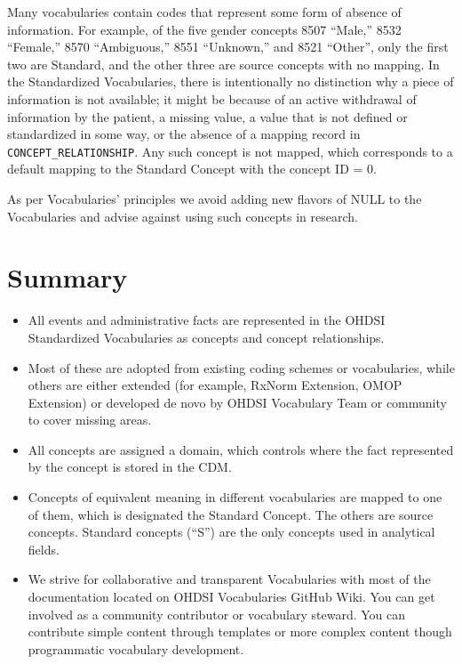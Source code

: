 \documentclass[
  letterpaper,
  paper=7in:10in,
  pagesize=pdftex,
  headinclude=on,
  footinclude=on,
  12pt]{scrbook}
\begin{document}
Many vocabularies contain codes that represent some form of absence of
information. For example, of the five gender concepts 8507 ``Male,''
8532 ``Female,'' 8570 ``Ambiguous,'' 8551 ``Unknown,'' and 8521
``Other'', only the first two are Standard, and the other three are
source concepts with no mapping. In the Standardized Vocabularies, there
is intentionally no distinction why a piece of information is not
available; it might be because of an active withdrawal of information by
the patient, a missing value, a value that is not defined or
standardized in some way, or the absence of a mapping record in
\texttt{CONCEPT\_RELATIONSHIP}. Any such concept is not mapped, which
corresponds to a default mapping to the Standard Concept with the
concept ID = 0.

As per Vocabularies' principles we avoid adding new flavors of NULL to
the Vocabularies and advise against using such concepts in research.

\section{Summary}\label{summary}

\begin{itemize}
\item
  All events and administrative facts are represented in the OHDSI
  Standardized Vocabularies as concepts and concept relationships.
\item
  Most of these are adopted from existing coding schemes or
  vocabularies, while others are either extended (for example, RxNorm
  Extension, OMOP Extension) or developed de novo by OHDSI Vocabulary
  Team or community to cover missing areas.
\item
  All concepts are assigned a domain, which controls where the fact
  represented by the concept is stored in the CDM.
\item
  Concepts of equivalent meaning in different vocabularies are mapped to
  one of them, which is designated the Standard Concept. The others are
  source concepts. Standard concepts (``S'') are the only concepts used
  in analytical fields.
\item
  We strive for collaborative and transparent Vocabularies with most of
  the documentation located on OHDSI Vocabularies GitHub Wiki. You can
  get involved as a community contributor or vocabulary steward. You can
  contribute simple content through templates or more complex content
  though programmatic vocabulary development.
\end{itemize}
\end{document}
